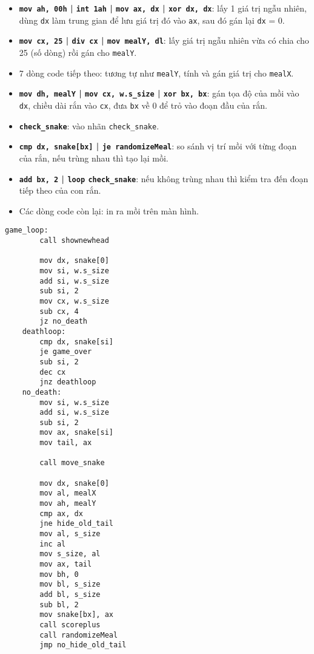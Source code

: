 \begin{itemize}
    \begin{itemize}
        \item \textbf{\texttt{mov ah, 00h} | \texttt{int 1ah} | \texttt{mov ax, dx} | \texttt{xor dx, dx}}: lấy 1 giá trị ngẫu nhiên, dùng \texttt{dx} làm trung gian để lưu giá trị đó vào \texttt{ax}, sau đó gán lại \texttt{dx} = 0.
        \item \textbf{\texttt{mov cx, 25} | \texttt{div cx} | \texttt{mov mealY, dl}}: lấy giá trị ngẫu nhiên vừa có chia cho 25 (số dòng) rồi gán cho \texttt{mealY}.
        \item 7 dòng code tiếp theo: tương tự như \texttt{mealY}, tính và gán giá trị cho \texttt{mealX}.
        \item \textbf{\texttt{mov dh, mealY} | \texttt{mov cx, w.}\texttt{s\_size} | \texttt{xor bx, bx}}: gán tọa độ của mồi vào \texttt{dx}, chiều dài rắn vào \texttt{cx}, đưa \texttt{bx} về 0 để trỏ vào đoạn đầu của rắn.
        \item \textbf{\texttt{check\_snake}}: vào nhãn \texttt{check\_snake}.
        \item \textbf{\texttt{cmp dx, snake[bx]} | \texttt{je randomizeMeal}}: so sánh vị trí mồi với từng đoạn của rắn, nếu trùng nhau thì tạo lại mồi.
        \item \textbf{\texttt{add bx, 2} | \texttt{loop} \texttt{check\_snake}}: nếu không trùng nhau thì kiểm tra đến đoạn tiếp theo của con rắn.
        \item Các dòng code còn lại: in ra mồi trên màn hình.
    \end{itemize}

\begin{lstlisting}[style=asm]
    game_loop:
        call shownewhead
    
        mov dx, snake[0]     
        mov si, w.s_size    
        add si, w.s_size    
        sub si, 2            
        mov cx, w.s_size    
        sub cx, 4
        jz no_death          
    deathloop:              
        cmp dx, snake[si]    
        je game_over
        sub si, 2           
        dec cx               
        jnz deathloop        
    no_death:
        mov si, w.s_size     
        add si, w.s_size
        sub si, 2
        mov ax, snake[si]    
        mov tail, ax
    
        call move_snake             
    
        mov dx, snake[0]          
        mov al, mealX             
        mov ah, mealY
        cmp ax, dx                
        jne hide_old_tail         
        mov al, s_size            
        inc al
        mov s_size, al            
        mov ax, tail             
        mov bh, 0
        mov bl, s_size           
        add bl, s_size            
        sub bl, 2
        mov snake[bx], ax           
        call scoreplus              
        call randomizeMeal          
        jmp no_hide_old_tail       
    

\end{lstlisting}
\end{itemize}
